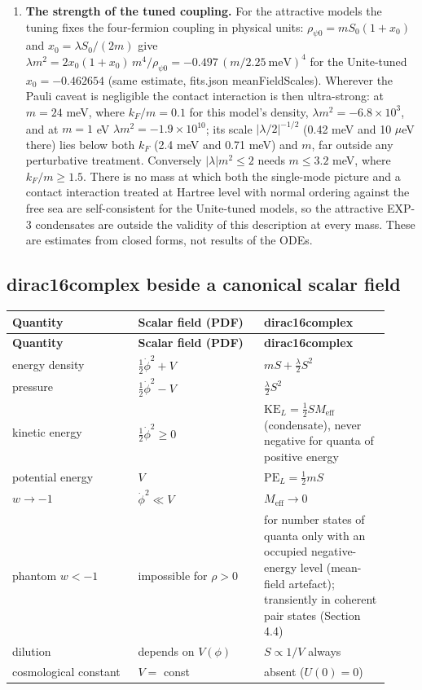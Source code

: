 \documentclass[11pt]{article}
\begin{document}
\begin{enumerate}
\item \textbf{The strength of the tuned coupling.} For the attractive models the tuning fixes the four-fermion coupling in physical units: $\rho_{\psi0}=mS_0(1+x_0)$ and $x_0=\lambda S_0/(2m)$ give $\lambda m^2=2x_0(1+x_0)\,m^4/\rho_{\psi0}=-0.497\,(m/2.25\ \mathrm{meV})^4$ for the Unite-tuned $x_0=-0.462654$ (same estimate, fits.json meanFieldScales). Wherever the Pauli caveat is negligible the contact interaction is then ultra-strong: at $m=24$ meV, where $k_F/m=0.1$ for this model's density, $\lambda m^2=-6.8\times10^{3}$, and at $m=1$ eV $\lambda m^2=-1.9\times10^{10}$; its scale $|\lambda/2|^{-1/2}$ (0.42 meV and 10 $\mu$eV there) lies below both $k_F$ (2.4 meV and 0.71 meV) and $m$, far outside any perturbative treatment. Conversely $|\lambda|m^2\le2$ needs $m\le3.2$ meV, where $k_F/m\ge1.5$. There is no mass at which both the single-mode picture and a contact interaction treated at Hartree level with normal ordering against the free sea are self-consistent for the Unite-tuned models, so the attractive EXP-3 condensates are outside the validity of this description at every mass. These are estimates from closed forms, not results of the ODEs.
\end{enumerate}

\subsection{dirac16complex beside a canonical scalar field}

\begin{longtable}{@{}p{0.307\linewidth}p{0.307\linewidth}p{0.307\linewidth}@{}}
\toprule
\textbf{Quantity} & \textbf{Scalar field (PDF)} & \textbf{dirac16complex} \\
\midrule
\endfirsthead
\toprule
\textbf{Quantity} & \textbf{Scalar field (PDF)} & \textbf{dirac16complex} \\
\midrule
\endhead
energy density & $\tfrac12\dot\phi^2+V$ & $mS+\tfrac\lambda2S^2$ \\
pressure & $\tfrac12\dot\phi^2-V$ & $\tfrac\lambda2S^2$ \\
kinetic energy & $\tfrac12\dot\phi^2\ge0$ & $\mathrm{KE}_L=\tfrac12SM_{\mathrm{eff}}$ (condensate), never negative for quanta of positive energy \\
potential energy & $V$ & $\mathrm{PE}_L=\tfrac12mS$ \\
$w\to-1$ & $\dot\phi^2\ll V$ & $M_{\mathrm{eff}}\to0$ \\
phantom $w<-1$ & impossible for $\rho>0$ & for number states of quanta only with an occupied negative-energy level (mean-field artefact); transiently in coherent pair states (Section 4.4) \\
dilution & depends on $V(\phi)$ & $S\propto1/V$ always \\
cosmological constant & $V=$ const & absent ($U(0)=0$) \\
\bottomrule
\end{longtable}
\end{document}
